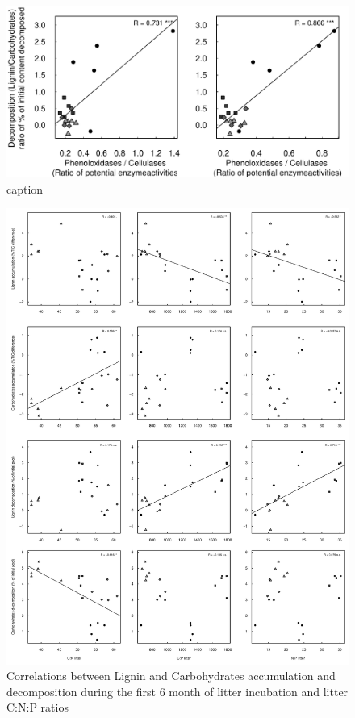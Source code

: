 \documentclass[authoryear,preprint,review,12pt]{elsarticle}
\begin{document}
\newpage
\begin{figure}[h!]
\vspace*{2mm}
\begin{center}
\includegraphics{sbb-enzcorr}
\end{center}
\caption{caption}
\label{fig:enzcor}
\end{figure}


\newpage
\begin{figure}[h!]
\vspace*{2mm}
\begin{center}
\includegraphics{sbb-graphcorr2}
\end{center}
\caption{Correlations between Lignin and Carbohydrates accumulation and decomposition during the first 6 month of litter incubation and litter C:N:P ratios}
\label{fig:cor2}
\end{figure}
\end{document}
